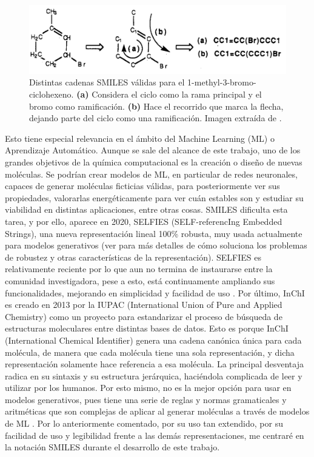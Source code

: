 \begin{figure}[h!]
\centering
    \includegraphics[scale=0.4]{imagenes/intro/sinonimos.png}
    \caption{Distintas cadenas SMILES válidas para el 1-methyl-3-bromo-ciclohexeno. \textbf{(a)} Considera el ciclo como la rama principal y el bromo como ramificación. \textbf{(b)} Hace el recorrido que marca la flecha, dejando parte del ciclo como una ramificación. Imagen extraída de \cite{weininger_smiles_1988}.}
    \label{fig:sinonimos_smiles}
\end{figure}

Esto tiene especial relevancia en el ámbito del Machine Learning (ML) o Aprendizaje Automático. Aunque se sale del alcance de este trabajo, uno de los grandes objetivos de la química computacional es la creación o diseño de nuevas moléculas. Se podrían crear modelos de ML, en particular de redes neuronales, capaces de generar moléculas ficticias válidas, para posteriormente ver sus propiedades, valorarlas energéticamente para ver cuán estables son y estudiar su viabilidad en distintas aplicaciones, entre otras cosas. SMILES dificulta esta tarea, y por ello, aparece en 2020, SELFIES (SELF-referencIng Embedded Strings), una nueva representación lineal 100\% robusta, muy usada actualmente para modelos generativos (ver \cite{SELFIES, krenn_self_referencing_2020} para más detalles de cómo soluciona los problemas de robustez y otras características de la representación). SELFIES es relativamente reciente por lo que aun no termina de instaurarse entre la comunidad investigadora, pese a esto, está continuamente ampliando sus funcionalidades, mejorando en simplicidad y facilidad de uso \cite{selfies_recent_2023}. Por último, InChI es creado en 2013 por la IUPAC (International Union of Pure and Applied Chemistry) como un proyecto para estandarizar el proceso de búsqueda de estructuras moleculares entre distintas bases de datos. Esto es porque InChI (International Chemical Identifier) genera una cadena canónica única para cada molécula, de manera que cada molécula tiene una sola representación, y dicha representación solamente hace referencia a esa molécula. La principal desventaja radica en su sintaxis y su estructura jerárquica, haciéndola complicada de leer y utilizar por los humanos. Por esto mismo, no es la mejor opción para usar en modelos generativos, pues tiene una serie de reglas y normas gramaticales y aritméticas que son complejas de aplicar al generar moléculas a través de modelos de ML \cite{heller_inchi_2015}. Por lo anteriormente comentado, por su uso tan extendido, por su facilidad de uso y legibilidad frente a las demás representaciones, me centraré en la notación SMILES durante el desarrollo de este trabajo. 

